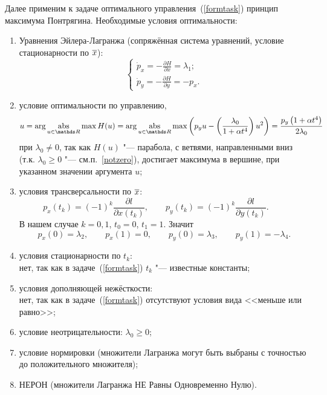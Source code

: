 Далее применим к задаче оптимального управления~(\ref{formtask}) принцип максимума Понтрягина. Необходимые условия оптимальности:
\begin{enumerate}
\item Уравнения Эйлера-Лагранжа (сопряжённая система уравнений, условие стационарности по $\overline{x}$):
\begin{equation}\label{Euler}
\begin{cases}
\dot {p}_x = - \frac{\partial H}{\partial x} = \lambda_1;\\
\dot {p}_y =  - \frac{\partial H}{\partial y} = -p_x.
\end{cases}
\end{equation}
\item\label{optimal}
условие оптимальности по управлению,
\[
u = \mathrm{arg} \mathop{\rm abs}\limits_{u \in \R} \max H(u) = \mathrm{arg} \mathop{\rm abs}\limits_{u \in \R} \max \left(p_y u - \left(\frac{\lambda_0}{1+\alpha t^4}\right)  u^2\right) = \frac{p_y \left(1+\alpha t^4\right)}{2\lambda_0}
\]
при $\lambda_0 \not= 0$, так как $H(u)$ "--- парабола, с ветвями, направленными вниз (т.к. $\lambda_0 \ge 0$
"--- см.п.~\ref{notzero}), достигает максимума в вершине, при указанном значении аргумента $u$;
\item\label{trans}
условия трансверсальности по $\overline{x}$:
\[
p_x(t_k) = (-1)^k \frac{\partial l}{\partial x(t_k)}, \qquad
p_y(t_k) = (-1)^k \frac{\partial l}{\partial y(t_k)}. \qquad
\]
В нашем случае $k = 0, 1$, $t_0 = 0$, $t_1 = 1$. Значит
\[
p_x(0) = \lambda_2,
\qquad
p_x(1) = 0,
\qquad
p_y(0) = \lambda_3,
\qquad
p_y(1) = - \lambda_4. 
\] 
\item условия стационарности по $t_k$:\\ нет, так как в задаче~(\ref{formtask}) $t_k$ "--- известные константы;
\item условия дополняющей нежёсткости:\\ нет, так как в задаче~(\ref{formtask}) отсутствуют условия вида <<меньше или равно>>;
\item\label{notzero}
условие неотрицательности: $\lambda_0 \ge 0$;
\item условие нормировки (множители Лагранжа могут быть выбраны с точностью до положительного множителя);
\item\label{NERON}
НЕРОН (множители Лагранжа НЕ Равны Одновременно Нулю).
\end{enumerate}